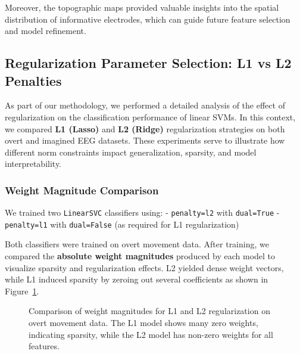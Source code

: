 \documentclass[
  letterpaper,
  DIV=11,
  numbers=noendperiod]{scrartcl}
\begin{document}
Moreover, the topographic maps provided valuable insights into the
spatial distribution of informative electrodes, which can guide future
feature selection and model refinement.

\subsection{Regularization Parameter Selection: L1 vs L2
Penalties}\label{regularization-parameter-selection-l1-vs-l2-penalties}

As part of our methodology, we performed a detailed analysis of the
effect of regularization on the classification performance of linear
SVMs. In this context, we compared \textbf{L1 (Lasso)} and \textbf{L2
(Ridge)} regularization strategies on both overt and imagined EEG
datasets. These experiments serve to illustrate how different norm
constraints impact generalization, sparsity, and model interpretability.

\subsubsection{Weight Magnitude
Comparison}\label{weight-magnitude-comparison}

We trained two \texttt{LinearSVC} classifiers using: -
\texttt{penalty=\textquotesingle{}l2\textquotesingle{}} with
\texttt{dual=True} -
\texttt{penalty=\textquotesingle{}l1\textquotesingle{}} with
\texttt{dual=False} (as required for L1 regularization)

Both classifiers were trained on overt movement data. After training, we
compared the \textbf{absolute weight magnitudes} produced by each model
to visualize sparsity and regularization effects. L2 yielded dense
weight vectors, while L1 induced sparsity by zeroing out several
coefficients as shown in Figure~\ref{fig-l1_vs_l2_weights}.

\begin{figure}


\caption{\label{fig-l1_vs_l2_weights}Comparison of weight magnitudes for
L1 and L2 regularization on overt movement data. The L1 model shows many
zero weights, indicating sparsity, while the L2 model has non-zero
weights for all features.}

\end{figure}%
\end{document}
